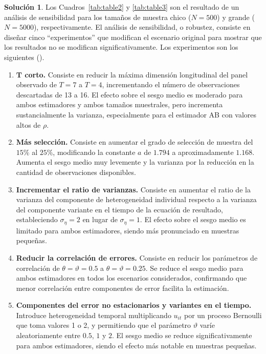 \documentclass[12pt,letterpaper,reqno,oneside]{amsart}
\theoremstyle{problemstyle} %
\theoremstyle{definition} %
\newtheorem{solution}{Solución}[problem]
\begin{document}
\begin{solution}
  Los Cuadros~\ref{tab:table2} y \ref{tab:table3} son el resultado de un análisis de sensibilidad para los tamaños de muestra chico ($N = 500$) y grande ($N = 5000$), respectivamente.
  El análisis de sensibilidad, o robustez, consiste en diseñar cinco \enquote{experimentos} que modifican el escenario original para mostrar que los resultados no se modifican significativamente.
  Los experimentos son los siguientes (\cite[16,17]{al-sadoonSimpleMethodsConsistent2019}).
  \begin{enumerate}[label=\textbf{Experimento \Roman*:}, ref=\Roman*, leftmargin=*, itemsep=0.5em]
    \item \label{exp:short-T} \textbf{$\boldsymbol{T}$ corto.} Consiste en reducir la máxima dimensión longitudinal del panel observado de $T = 7$ a $T = 4$, incrementando el número de observaciones descartadas de 13 a 16. El efecto sobre el sesgo medio es moderado para ambos estimadores y ambos tamaños muestrales, pero incrementa sustancialmente la varianza, especialmente para el estimador AB con valores altos de $\rho$.
    \item \label{exp:more-selection} \textbf{Más selección.} Consiste en aumentar el grado de selección de muestra del $15\%$ al $25\%$, modificando la constante $a$ de $1.794$ a aproximadamente $1.168$. Aumenta el sesgo medio muy levemente y la varianza por la reducción en la cantidad de observaciones disponibles.
    \item \label{exp:variance-ratio} \textbf{Incrementar el ratio de varianzas.} Consiste en aumentar el ratio de la varianza del componente de heterogeneidad individual respecto a la varianza del componente variante en el tiempo de la ecuación de resultado, estableciendo $\sigma_\eta = 2$ en lugar de $\sigma_\eta = 1$. El efecto sobre el sesgo medio es limitado para ambos estimadores, siendo más pronunciado en muestras pequeñas.
    \item \label{exp:reduce-correlation} \textbf{Reducir la correlación de errores.} Consiste en reducir los parámetros de correlación de $\theta = \vartheta = 0.5$ a $\theta = \vartheta = 0.25$. Se reduce el sesgo medio para ambos estimadores en todos los escenarios considerados, confirmando que menor correlación entre componentes de error facilita la estimación.
    \item \label{exp:time-varying} \textbf{Componentes del error no estacionarios y variantes en el tiempo.} Introduce heterogeneidad temporal multiplicando $u_{it}$ por un proceso Bernoulli que toma valores 1 o 2, y permitiendo que el parámetro $\vartheta$ varíe aleatoriamente entre $0.5$, $1$ y $2$. El sesgo medio se reduce significativamente para ambos estimadores, siendo el efecto más notable en muestras pequeñas.
  \end{enumerate}


\end{solution}
\end{document}
